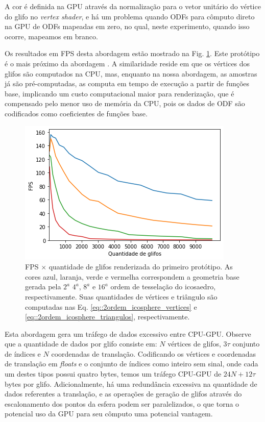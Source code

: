 \documentclass[
    12pt,                %
    oneside,            %
    a4paper,            %
    english,            %
    french,                %
    spanish,            %
    brazil                %
    ]{abntex2}
\begin{document}
A cor é definida na GPU através da normalização para o vetor unitário do vértice do glifo no \textit{vertex shader}, e há um problema quando ODFs para cômputo direto na GPU de ODFs mapeadas em zero, no qual, neste experimento, quando isso ocorre, mapeamos em branco.

Os resultados em FPS desta abordagem estão mostrado na Fig. \ref{fig::FPS_prototipo_1}. Este protótipo é o mais próximo da abordagem . A similaridade reside em que os vértices dos glifos são computados na CPU, mas, enquanto na nossa abordagem, as amostras já são pré-computadas,  as computa em tempo de execução a partir de funções base, implicando um custo computacional maior para renderização, que é compensado pelo menor uso de memória da CPU, pois os dados de ODF são codificados como coeficientes de funções base.



\begin{figure}[htb]
    \centering
    \includegraphics[width=.65\linewidth, angle=0]{figs/Renderizacao_glifos_evolucao/FPS_prototipo1_Geral.png}
    \caption{FPS $\times$ quantidade de glifos renderizada do primeiro protótipo. As cores azul, laranja, verde e vermelha correspondem a geometria base gerada pela $2^{a}$ $4^{a}$, $8^{a}$ e $16^{a}$ ordem de tesselação do icosaedro, respectivamente. Suas quantidades de vértices e triângulo são computadas nas Eq. \ref{eq::2ordem_icosphere_vertices} e \ref{eq::2ordem_icosphere_triangulos}, respectivamente.}
    \label{fig::FPS_prototipo_1}
\end{figure}

Esta abordagem gera um tráfego de dados excessivo entre CPU-GPU. Observe que a quantidade de dados por glifo consiste em: $N$ vértices de glifos, $3\tau$ conjunto de índices e $N$ coordenadas de translação. Codificando os vértices e coordenadas de translação em \textit{floats} e o conjunto de índices como inteiro sem sinal, onde cada um destes tipos possui quatro bytes, temos um tráfego CPU-GPU de $24N + 12\tau$ bytes por glifo. Adicionalmente, há uma redundância excessiva na quantidade de dados referentes a translação, e as operações de geração de glifos através do escalonamento dos pontos da esfera podem ser paralelizados, o que torna o potencial uso da GPU para seu cômputo uma potencial vantagem.
\end{document}
